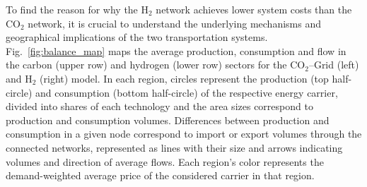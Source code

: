 \documentclass[twocolumn]{article}
\newcommand{\carbon}{CO$_2$}
\newcommand{\hydrogen}{H$_2$}
\newcommand{\carbongrid}{\carbon{}--Grid}
\newcommand{\hydrogengrid}{\hydrogen{}--Grid}
\begin{document}
To find the reason for why the \hydrogen{} network achieves lower system costs than the \carbon{} network, it is crucial to understand the underlying mechanisms and geographical implications of the two transportation systems. Fig.~\ref{fig:balance_map} maps the average production, consumption and flow in the carbon (upper row) and hydrogen (lower row) sectors for the \carbongrid{} (left) and \hydrogen{} (right) model. In each region, circles represent the production (top half-circle) and consumption (bottom half-circle) of the respective energy carrier, divided into shares of each technology and the area sizes correspond to production and consumption volumes. Differences between production and consumption in a given node correspond to import or export volumes through the connected networks, represented as lines with their size and arrows indicating volumes and direction of average flows. Each region's color represents the demand-weighted average price of the considered carrier in that region.
\end{document}
